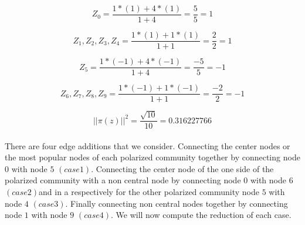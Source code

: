 \begin{equation}
Z_0 = \frac{1*(1) + 4*(1)}{1 + 4} = \frac{5}{5} = 1
\end{equation}

\begin{equation}
Z_1,Z_2,Z_3,Z_4 = \frac{1*(1) + 1*(1)}{1 + 1} = \frac{2}{2} = 1
\end{equation}

\begin{equation}
Z_5 = \frac{1*(-1) + 4*(-1)}{1 + 4} = \frac{-5}{5} = -1
\end{equation}

\begin{equation}
Z_6,Z_7,Z_8,Z_9 = \frac{1*(-1) + 1*(-1)}{1 + 1} = \frac{-2}{2} = -1
\end{equation}

\begin{equation}
||\pi(z)||^2 = \frac{\sqrt{10}}{10} = 0.316227766
\end{equation}
\\

There are four edge additions that we consider. Connecting the center nodes or the most popular nodes of each polarized community together by connecting node $0$ with node $5$ $(case 1)$. Connecting the center node of the one side of the polarized community with a non central node by connecting node $0$ with node $6$ $(case 2)$and in a respectively for the other polarized community node $5$ with node $4$ $(case 3)$. Finally connecting non central nodes together by connecting node $1$ with node $9$ $(case 4)$.
We will now compute the reduction of each case.


